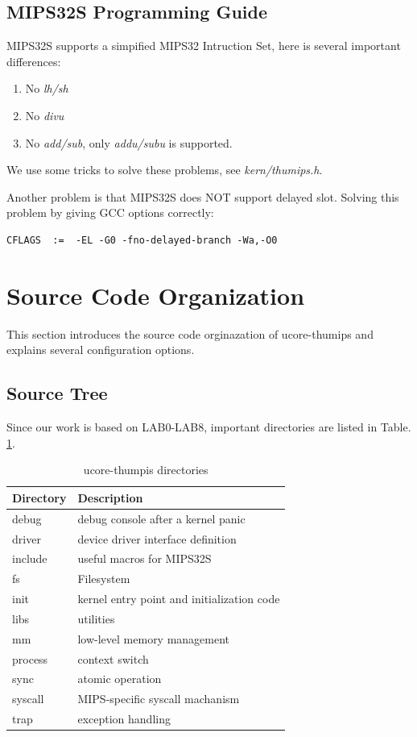 \documentclass[a4paper]{article}
\begin{document}
\subsection{MIPS32S Programming Guide}
MIPS32S supports a simpified MIPS32 Intruction Set, here is several important differences:

\begin{enumerate}
\item No \emph{lh/sh}
\item No \emph{divu}
\item No \emph{add/sub}, only \emph{addu/subu} is supported.
\end{enumerate}

We use some tricks to solve these problems, see \emph{kern/thumips.h}.

Another problem is that MIPS32S does NOT support delayed slot. Solving 
this problem by giving GCC options correctly:

\begin{verbatim}
CFLAGS	:=  -EL -G0 -fno-delayed-branch -Wa,-O0
\end{verbatim}


\section{Source Code Organization}
This section introduces the source code orginazation of ucore-thumips
and explains several configuration options.
\subsection{Source Tree}
Since our work is based on LAB0-LAB8, important directories are listed in Table. \ref{tab:dir}.

\begin{table}[h]
  \centering
  \begin{tabular}{|l|l|}
    \hline
    Directory & Description \\
    \hline
    debug  &     debug console after a kernel panic \\
    driver &     device driver interface definition \\
    include &    useful macros for MIPS32S \\
    fs     &     Filesystem \\
    init   &     kernel entry point and initialization code \\
    libs   &     utilities \\
    mm     &     low-level memory management \\
    process   &  context switch             \\
    sync   &     atomic operation           \\
    syscall &     MIPS-specific syscall machanism \\
    trap   &     exception handling  \\
    \hline
  \end{tabular}
  \caption{ucore-thumpis directories}
  \label{tab:dir}
\end{table}
\end{document}
